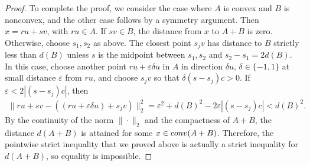 \documentclass[10pt,a4paper]{amsart}
\begin{document}
\begin{proof}
    To complete the proof, we consider the case where $A$ is convex and $B$ is nonconvex, and the other case follows by a symmetry argument. Then $x=ru+sv$, with $ru\in A$. If $sv\in B$, the distance from $x$ to $A+B$ is zero. Otherwise, choose $s_1,s_2$ as above. The closest point $s_jv$ has distance to $B$ strictly less than $d(B)$ unless $s$ is the midpoint between $s_1,s_2$ and $s_2-s_1=2d(B)$. In this case, choose another point $ru+\varepsilon \delta u$ in $A$ in direction $\delta u$, $\delta\in \{-1,1\}$ at small distance $\varepsilon$ from $ru$, and choose $s_jv$ so that $\delta(s-s_j)c>0$. If $\varepsilon <2|(s-s_j)c|$, then
    \begin{align*}
        \|ru+sv-((ru+\varepsilon \delta u )+s_jv)\|_2^2=\varepsilon^2+d(B)^2-2\varepsilon|(s-s_j)c|<d(B)^2.
    \end{align*}
    By the continuity of the norm $\|\cdot \|_2$ and the compactness of $A+B$, the distance $d(A+B)$ is attained for some $x\in \textup{conv}(A+B)$. Therefore, the pointwise strict inequality that we proved above is actually a strict inequality for $d(A+B)$, so equality is impossible.
\end{proof}
\end{document}
